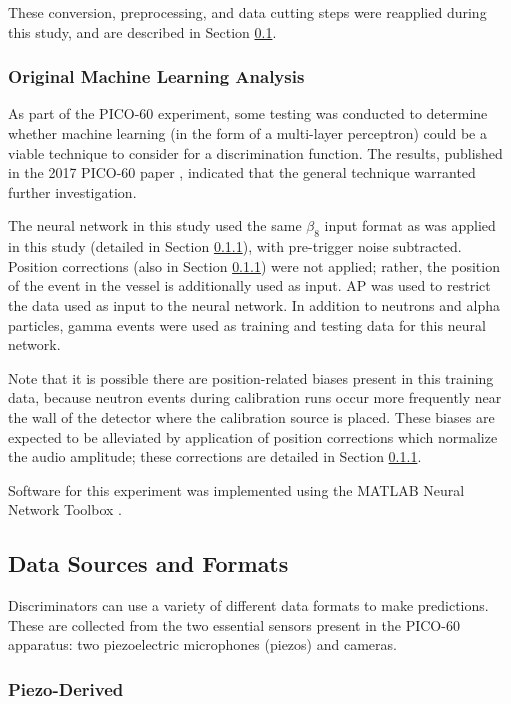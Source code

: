 \documentclass[10pt]{article}
\begin{document}
These conversion, preprocessing, and data cutting steps were reapplied during this study, and are described in Section \ref{data_formats}.

\subsubsection{Original Machine Learning Analysis} \label{og_analysis}

As part of the PICO-60 experiment, some testing was conducted to determine whether machine learning (in the form of a multi-layer perceptron) could be a viable technique to consider for a discrimination function. The results, published in the 2017 PICO-60 paper \cite{pico}, indicated that the general technique warranted further investigation.

The neural network in this study used the same $\beta_{8}$ input format as was applied in this study (detailed in Section \ref{piezo_derived}), with pre-trigger noise subtracted. Position corrections (also in Section \ref{piezo_derived}) were not applied; rather, the position of the event in the vessel is additionally used as input. AP was used to restrict the data used as input to the neural network. In addition to neutrons and alpha particles, gamma events were used as training and testing data for this neural network.

Note that it is possible there are position-related biases present in this training data, because neutron events during calibration runs occur more frequently near the wall of the detector where the calibration source is placed. These biases are expected to be alleviated by application of position corrections which normalize the audio amplitude; these corrections are detailed in Section \ref{piezo_derived}.

Software for this experiment was implemented using the MATLAB Neural Network Toolbox \cite{matlab}.

\subsection{Data Sources and Formats} \label{data_formats}

Discriminators can use a variety of different data formats to make predictions. These are collected from the two essential sensors present in the PICO-60 apparatus: two piezoelectric microphones (piezos) and cameras.

\subsubsection{Piezo-Derived} \label{piezo_derived}
\end{document}
